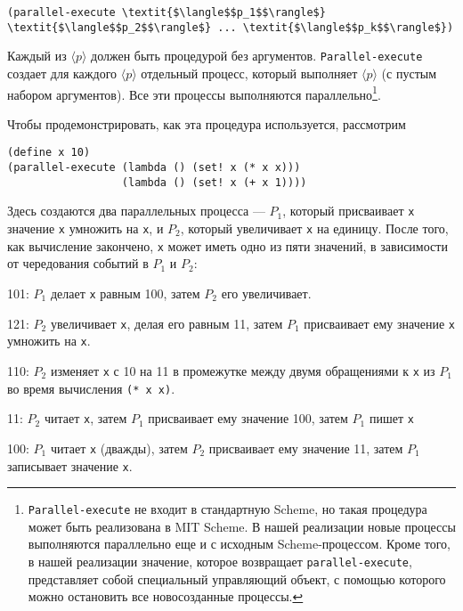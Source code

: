 \begin{Verbatim}[fontsize=\small]
 (parallel-execute \textit{$\langle$$p_1$$\rangle$} \textit{$\langle$$p_2$$\rangle$} ... \textit{$\langle$$p_k$$\rangle$})
\end{Verbatim}
Каждый из \textit{$\langle$$p$$\rangle$} должен быть процедурой без
аргументов. {\tt Parallel-execute} создает для каждого
\textit{$\langle$$p$$\rangle$} отдельный процесс, который выполняет
\textit{$\langle$$p$$\rangle$} (с пустым набором аргументов).  Все
эти процессы выполняются параллельно\footnote{{\tt Parallel-execute} не входит в стандартную
Scheme, но такая процедура может быть реализована в MIT Scheme.  В
нашей реализации новые процессы выполняются параллельно еще и с
исходным Scheme-процессом.  Кроме того, в нашей реализации значение,
которое возвращает {\tt parallel-execute}, представляет собой
специальный управляющий объект, с помощью которого можно остановить
все новосозданные процессы.
}.

Чтобы продемонстрировать, как эта процедура используется,
рассмотрим

\begin{Verbatim}[fontsize=\small]
(define x 10)
(parallel-execute (lambda () (set! x (* x x)))
                  (lambda () (set! x (+ x 1))))
\end{Verbatim}
Здесь создаются два параллельных процесса --- $P_1$,
который присваивает {\tt x} значение {\tt x} умножить на
{\tt x}, и $P_2$, который увеличивает {\tt x}
на единицу.  После того, как вычисление закончено,
{\tt x} может иметь одно из пяти значений, в зависимости от
чередования событий в $P_1$ и $P_2$:

\begin{plainlist}


\item
101: $P_1$ делает {\tt x} равным
100, затем $P_2$ его увеличивает.

\item
121: $P_2$ увеличивает {\tt x},
делая его равным 11, затем $P_1$ присваивает ему значение
{\tt x} умножить на {\tt x}.

\item
110: $P_2$ изменяет {\tt x} с 10
на 11 в промежутке между двумя обращениями к {\tt x} из
$P_1$ во время вычисления {\tt (* x x)}.

\item
11: $P_2$ читает {\tt x}, затем
$P_1$ присваивает ему значение 100, затем $P_1$
пишет {\tt x}

\item
100: $P_1$ читает {\tt x}
(дважды), затем $P_2$ присваивает ему значение 11, затем
$P_1$ записывает значение {\tt x}.
\end{plainlist}

